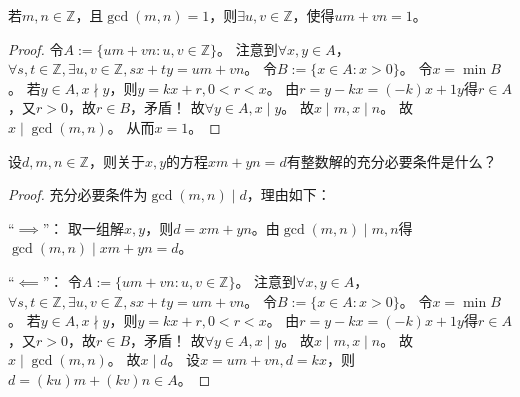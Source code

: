 \documentclass{ctexart}
\newif\ifpreface
\begin{document}
\large
\setlength{\baselineskip}{1.2em}
\ifpreface
	
\else
	\maketitle
\fi
{}
若\(m,n \in \mathbb{Z}\)，且\(\gcd( m,n)=1\)，则\(\exists u,v \in \mathbb{Z}\)，使得\(um+vn=1\)。
\begin{proof}
	令\(A:=\{ um+vn:u,v \in \mathbb{Z}\}\)。
	注意到\(\forall x,y \in A\)，\(\forall s,t \in \mathbb{Z},\exists u,v \in \mathbb{Z},sx+ty=um+vn\)。
	令\(B:=\{ x \in A:x>0\}\)。
	令\(x=\min B\)。
	若\(y \in A,x \nmid y\)，则\(y=kx+r,0<r<x\)。
	由\(r=y-kx=( -k)x+1y\)得\(r \in A\)，又\(r>0\)，故\(r \in B\)，矛盾！
	故\(\forall y \in A,x \mid y\)。
	故\(x \mid m,x \mid n\)。
	故\(x \mid \gcd( m,n)\)。
	从而\(x=1\)。
\end{proof}

设\(d,m,n\in \mathbb{Z}\)，则关于\(x,y\)的方程\(xm+yn=d\)有整数解的充分必要条件是什么？
\begin{proof}
	充分必要条件为\(\gcd( m,n) \mid d\)，理由如下：

	``\(\implies\)''：
	取一组解\(x,y\)，则\(d=xm+yn\)。由\(\gcd( m,n) \mid m,n\)得\(\gcd( m,n)\mid xm+yn=d\)。

	``\(\impliedby\)''：
	令\(A:=\{ um+vn:u,v \in \mathbb{Z}\}\)。
	注意到\(\forall x,y \in A\)，\(\forall s,t \in \mathbb{Z},\exists u,v \in \mathbb{Z},sx+ty=um+vn\)。
	令\(B:=\{ x \in A:x>0\}\)。
	令\(x=\min B\)。
	若\(y \in A,x \nmid y\)，则\(y=kx+r,0<r<x\)。
	由\(r=y-kx=( -k)x+1y\)得\(r \in A\)，又\(r>0\)，故\(r \in B\)，矛盾！
	故\(\forall y \in A,x \mid y\)。
	故\(x \mid m,x \mid n\)。
	故\(x \mid \gcd( m,n)\)。
	故\(x \mid d\)。
	设\(x=um+vn,d=kx\)，则\(d=( ku)m+( kv)n \in A\)。
\end{proof}
\end{document}
